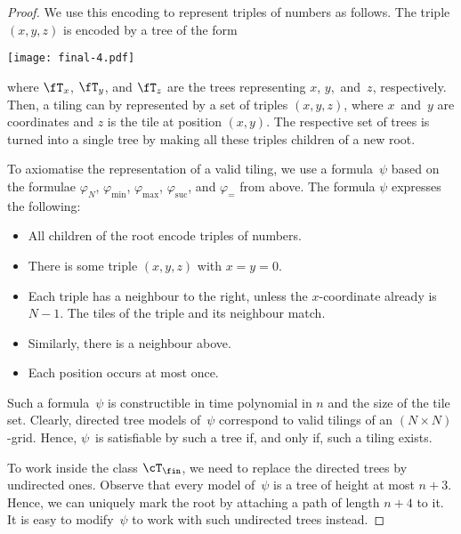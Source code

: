 \documentclass{LMCS}
\begin{document}
\begin{proof}
\noindent We use this encoding to represent triples of numbers as follows.
The triple $(x,y,z)$ is encoded by a tree of the form
\begin{center}
\texttt{[image: final-4.pdf]}
\end{center}
where $\fT_x$, $\fT_y$, and $\fT_z$ are the trees representing
$x$, $y$,~and~$z$, respectively.
Then, a tiling can by represented by a set of triples $(x,y,z)$,
where $x$~and~$y$ are coordinates and $z$ is the tile at position $(x,y)$.
The respective set of trees is turned into a single tree
by making all these triples children of a new root.

To axiomatise the representation of a valid tiling,
we use a formula~$\psi$ based on the formulae
$\varphi_N$, $\varphi_{\min}$, $\varphi_{\max}$,
$\varphi_{\mathrm{suc}}$, and $\varphi_=$ from above.
The formula $\psi$ expresses the following\?:
\begin{itemize}
\item All children of the root encode triples of numbers.
\item There is some triple $(x,y,z)$ with $x = y = 0$.
\item Each triple has a neighbour to the right,
  unless the $x$-coordinate already is $N-1$.
  The tiles of the triple and its neighbour match.
\item Similarly, there is a neighbour above.
\item Each position occurs at most once.
\end{itemize}

Such a formula~$\psi$ is constructible
in time polynomial in $n$ and the size of the tile set.
Clearly, directed tree models of~$\psi$
correspond to valid tilings of an $(N\times N)$-grid.
Hence, $\psi$~is satisfiable by such a tree if, and only if,
such a tiling exists.

To work inside the class $\cT_\fin$,
we need to replace the directed trees by undirected ones.
Observe that every model of~$\psi$ is a tree of height at most $n+3$.
Hence, we can uniquely mark the root by attaching a path of length $n+4$ to it.
It is easy to modify~$\psi$ to work with such undirected trees instead.
\end{proof}
\end{document}
